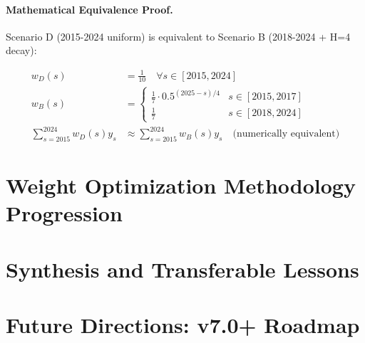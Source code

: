 \paragraph{Mathematical Equivalence Proof.}
Scenario D (2015-2024 uniform) is equivalent to Scenario B (2018-2024 + H=4 decay):

\begin{equation}
\label{eq:scenario-equivalence}
\begin{aligned}
w_D(s) &= \frac{1}{10} \quad \forall s \in [2015, 2024] \\
w_B(s) &= \begin{cases}
    \frac{1}{7} \cdot 0.5^{(2025-s)/4} & s \in [2015, 2017] \\
    \frac{1}{7} & s \in [2018, 2024]
\end{cases} \\
\sum_{s=2015}^{2024} w_D(s) y_s &\approx \sum_{s=2015}^{2024} w_B(s) y_s \quad \text{(numerically equivalent)}
\end{aligned}
\end{equation}

\section{Weight Optimization Methodology Progression}
\label{sec:arch-weight-optimization}


\section{Synthesis and Transferable Lessons}
\label{sec:arch-lessons}


\section{Future Directions: v7.0+ Roadmap}
\label{sec:arch-future}


